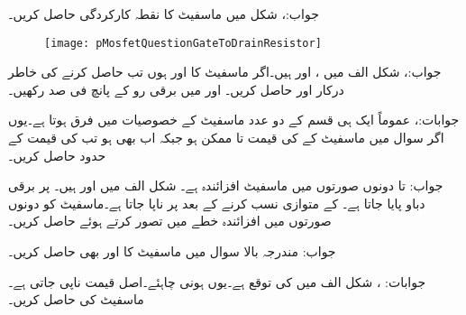 جواب:، 
شکل  میں ماسفیٹ کا نقطہ کارکردگی حاصل کریں۔
\begin{figure}
\centering
\texttt{[image: pMosfetQuestionGateToDrainResistor]}
\caption{}
\label{شکل_ماسفیٹ_مزاحمت_گیٹ_سے_محاصل}
\end{figure}

جواب:، 
شکل  الف میں ،  اور  ہیں۔اگر ماسفیٹ کا  اور  ہوں تب  حاصل کرنے کی خاطر درکار  اور  حاصل کریں۔ اور  میں برقی رو  کے پانچ فی صد رکھیں۔

جوابات:، 
عموماً ایک ہی قسم کے دو عدد ماسفیٹ کے خصوصیات میں فرق ہوتا ہے۔یوں اگر سوال  میں ماسفیٹ کے  کی قیمت  تا  ممکن ہو جبکہ  اب بھی  ہو تب  کی قیمت کے حدود حاصل کریں۔

جواب: تا  دونوں صورتوں میں ماسفیٹ افزائندہ ہے۔
شکل   الف میں  اور  ہیں۔ پر  برقی دباو پایا جاتا ہے۔ کے متوازی  نسب کرنے کے بعد  پر  ناپا جاتا ہے۔ماسفیٹ کو دونوں صورتوں میں افزائندہ خطے میں تصور کرتے ہوئے  حاصل کریں۔

جواب:
مندرجہ بالا سوال میں ماسفیٹ کا  اور  بھی حاصل کریں۔

جوابات: ، 
شکل  الف میں  کی توقع ہے۔یوں  ہونی چاہئے۔اصل قیمت  ناپی جاتی ہے۔ماسفیٹ کی  حاصل کریں۔

